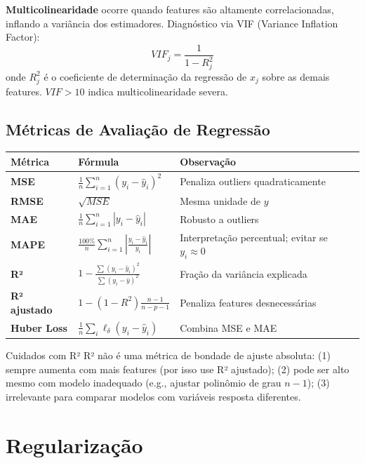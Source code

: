 \documentclass[12pt,a4paper]{article}
\begin{document}
\textbf{Multicolinearidade} ocorre quando features são altamente correlacionadas, inflando a variância dos estimadores. Diagnóstico via VIF (Variance Inflation Factor):
\[
  VIF_j = \frac{1}{1 - R_j^2}
\]
onde $R_j^2$ é o coeficiente de determinação da regressão de $x_j$ sobre as demais features. $VIF > 10$ indica multicolinearidade severa.

\subsection{Métricas de Avaliação de Regressão}

\begin{center}
\begin{tabular}{>{\bfseries}p{3cm}p{6cm}p{3.5cm}}
\toprule
Métrica & Fórmula & Observação \\
\midrule
MSE & $\frac{1}{n}\sum_{i=1}^n(y_i - \hat{y}_i)^2$ & Penaliza outliers quadraticamente \\
RMSE & $\sqrt{MSE}$ & Mesma unidade de $y$ \\
MAE & $\frac{1}{n}\sum_{i=1}^n|y_i - \hat{y}_i|$ & Robusto a outliers \\
MAPE & $\frac{100\%}{n}\sum_{i=1}^n\left|\frac{y_i-\hat{y}_i}{y_i}\right|$ & Interpretação percentual; evitar se $y_i \approx 0$ \\
R² & $1 - \frac{\sum(y_i-\hat{y}_i)^2}{\sum(y_i-\bar{y})^2}$ & Fração da variância explicada \\
R² ajustado & $1 - (1-R^2)\frac{n-1}{n-p-1}$ & Penaliza features desnecessárias \\
Huber Loss & $\frac{1}{n}\sum_i \ell_\delta(y_i-\hat{y}_i)$ & Combina MSE e MAE \\
\bottomrule
\end{tabular}
\end{center}

\begin{atencaobox}{Cuidados com R²}
R² não é uma métrica de bondade de ajuste absoluta: (1) sempre aumenta com mais features (por isso use R² ajustado); (2) pode ser alto mesmo com modelo inadequado (e.g., ajustar polinômio de grau $n-1$); (3) irrelevante para comparar modelos com variáveis resposta diferentes.
\end{atencaobox}

\section{Regularização}
\end{document}
